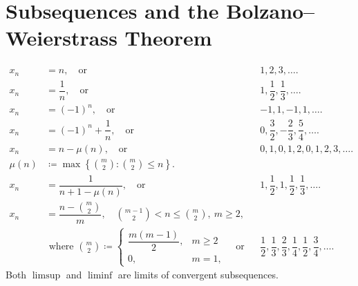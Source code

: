 
\section{Subsequences and the Bolzano–Weierstrass Theorem}


\begin{example}
    \begin{align}
        x_n &= n, \quad \text{or} && 1,2,3,\ldots.\nonumber\\
        x_n &= \dfrac{1}{n},\quad\text{or}&& 1,\dfrac{1}{2},\dfrac{1}{3},\ldots.\label{eq:8.1.1}\\
        x_n &= (-1)^n,\quad\text{or}&& -1,1,-1,1,\ldots.\label{eq:8.1.2}\\
        x_n &= (-1)^n + \dfrac{1}{n}, \quad\text{or}&& 0,\dfrac{3}{2}, -\dfrac{2}{3},\dfrac{5}{4},\ldots.\label{eq:8.1.3}\\
        x_n &= n - \mu(n), \quad\text{or}&&0,1,0,1,2,0,1,2,3,\ldots.\nonumber\\
        \mu(n)&\coloneqq \max\left\{ {m\choose 2} : {m\choose 2}\leq n \right\}.\nonumber\\
        x_n &= \dfrac{1}{n+1 - \mu(n)},\quad\text{or}&&1,\dfrac{1}{2},1,\dfrac{1}{2},\dfrac{1}{3},\ldots.\nonumber\\
        x_n&=\dfrac{n - {m\choose 2}}{m}, \quad {m-1\choose 2}< n\leq {m\choose 2},\ m \geq 2,\nonumber\\
        &\text{ where } {m\choose 2}\coloneqq\begin{cases}
                                                 \dfrac{m(m-1)}{2}, & m\geq 2\\
                                                 0, & m = 1,
        \end{cases}\quad\text{or} && \dfrac{1}{2},\dfrac{1}{3},\dfrac{2}{3},\dfrac{1}{4},\dfrac{1}{2},\dfrac{3}{4},\ldots.\label{eq:8.1.4}
    \end{align}
    Both $\limsup$ and $\liminf$ are limits of convergent subsequences.
\end{example}

